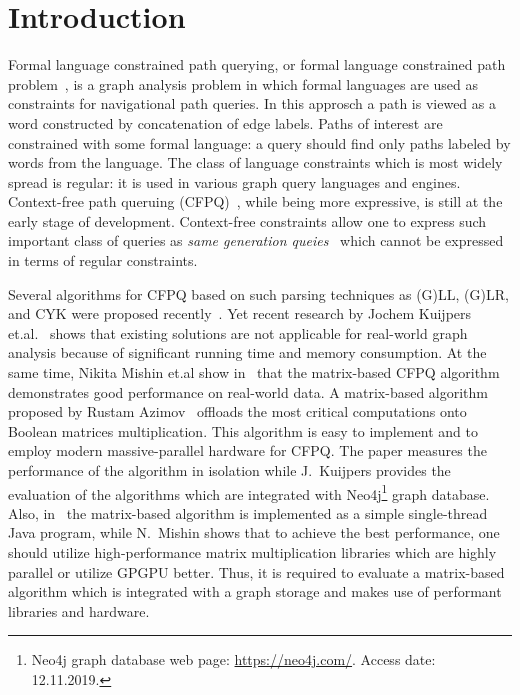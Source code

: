 \section{Introduction}

Formal language constrained path querying, or formal language constrained path problem~\cite{FLCpathProblem}, is a graph analysis problem in which formal languages are used as constraints for navigational path queries.
In this approsch a path is viewed as a word constructed by concatenation of edge labels.
Paths of interest are constrained with some formal language: a query should find only paths labeled by words from the language.
The class of language constraints which is most widely spread is regular: it is used in various graph query languages and engines.
Context-free path queruing (CFPQ)~\cite{Yannakakis}, while being more expressive, is still at the early stage of development.
Context-free constraints allow one to express such important class of queries as \textit{same generation queies}~\cite{FndDB} which cannot be expressed in terms of regular constraints.

Several algorithms for CFPQ based on such parsing techniques as (G)LL, (G)LR, and CYK were proposed recently~\cite{bradford2007quickest,ward2008distributed,bradford2016fast,hellingsPathQuerying,Grigorev:2017:CPQ:3166094.3166104,Verbitskaia:2018:PCC:3241653.3241655,RDF,10.1007/978-3-319-91662-0_17,Medeiros:2018:EEC:3167132.3167265}.
Yet recent research by Jochem Kuijpers et.al.~\cite{Kuijpers:2019:ESC:3335783.3335791} shows that existing solutions are not applicable for real-world graph analysis because of significant running time and memory consumption.
At the same time, Nikita Mishin et.al show in~\cite{Mishin:2019:ECP:3327964.3328503} that the matrix-based CFPQ algorithm demonstrates good performance on real-world data.
A matrix-based algorithm proposed by Rustam Azimov~\cite{Azimov:2018:CPQ:3210259.3210264} offloads the most critical computations onto Boolean matrices multiplication.
This algorithm is easy to implement and to employ modern massive-parallel hardware for CFPQ.
The paper measures the performance of the algorithm in isolation while J.~Kuijpers provides the evaluation of the algorithms which are integrated with Neo4j\footnote{Neo4j graph database web page: \url{https://neo4j.com/}. Access date: 12.11.2019.} graph database.
Also, in~\cite{Kuijpers:2019:ESC:3335783.3335791} the matrix-based algorithm is implemented as a simple single-thread Java program, while N.~Mishin shows that to achieve the best performance, one should utilize high-performance matrix multiplication libraries which are highly parallel or utilize GPGPU better.
Thus, it is required to evaluate a matrix-based algorithm which is integrated with a graph storage and makes use of performant libraries and hardware.

